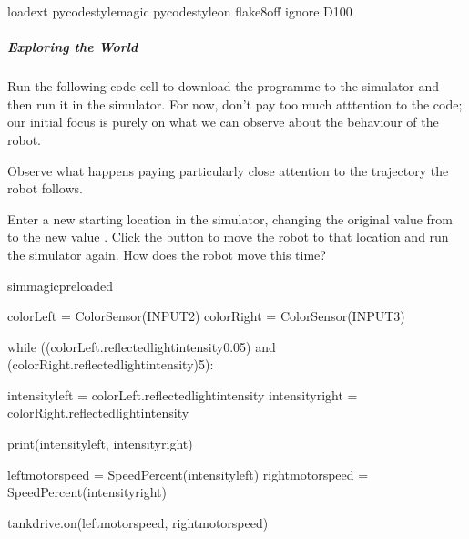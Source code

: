 \documentclass[letterpaper,10pt,english]{sphinxmanual}
\begin{document}
{{\begin{sphinxVerbatim}[commandchars=\\\{\}]
\PYGZsh{}\PYGZpc{}load\PYGZus{}ext pycodestyle\PYGZus{}magic
\PYGZsh{}\PYGZpc{}pycodestyle\PYGZus{}on
\PYGZsh{}\PYGZpc{}flake8\PYGZus{}off \PYGZhy{}\PYGZhy{}ignore D100
\end{sphinxVerbatim}
}


\subparagraph{Exploring the  World}
\label{\detokenize{content/03_Robot_Lab/Section_00_03:Exploring-the-Radial-Grey-World}}
Run the following code cell to download the programme to the simulator and then run it in the simulator. For now, don’t pay too much atttention to the code; our initial focus is purely on what we can observe about the behaviour of the robot.

Observe what happens paying particularly close attention to the trajectory the robot follows.

Enter a new starting location in the simulator, changing the original  value from  to the new value . Click the  button to move the robot to that location and run the simulator again. How does the robot move this time?

{
\begin{sphinxVerbatim}[commandchars=\\\{\}]
\llap{\color{nbsphinxin}[ ]:\,\hspace{\fboxrule}\hspace{\fboxsep}}\PYGZpc{}\PYGZpc{}sim\PYGZus{}magic\PYGZus{}preloaded

colorLeft = ColorSensor(INPUT\PYGZus{}2)
colorRight = ColorSensor(INPUT\PYGZus{}3)

while ((colorLeft.reflected\PYGZus{}light\PYGZus{}intensity\PYGZgt{}0.05)
       and (colorRight.reflected\PYGZus{}light\PYGZus{}intensity)\PYGZgt{}5):

    intensity\PYGZus{}left = colorLeft.reflected\PYGZus{}light\PYGZus{}intensity
    intensity\PYGZus{}right = colorRight.reflected\PYGZus{}light\PYGZus{}intensity

    print(intensity\PYGZus{}left, intensity\PYGZus{}right)

    left\PYGZus{}motor\PYGZus{}speed = SpeedPercent(intensity\PYGZus{}left)
    right\PYGZus{}motor\PYGZus{}speed = SpeedPercent(intensity\PYGZus{}right)

    tank\PYGZus{}drive.on(left\PYGZus{}motor\PYGZus{}speed, right\PYGZus{}motor\PYGZus{}speed)
\end{sphinxVerbatim}
}

}
\end{document}
